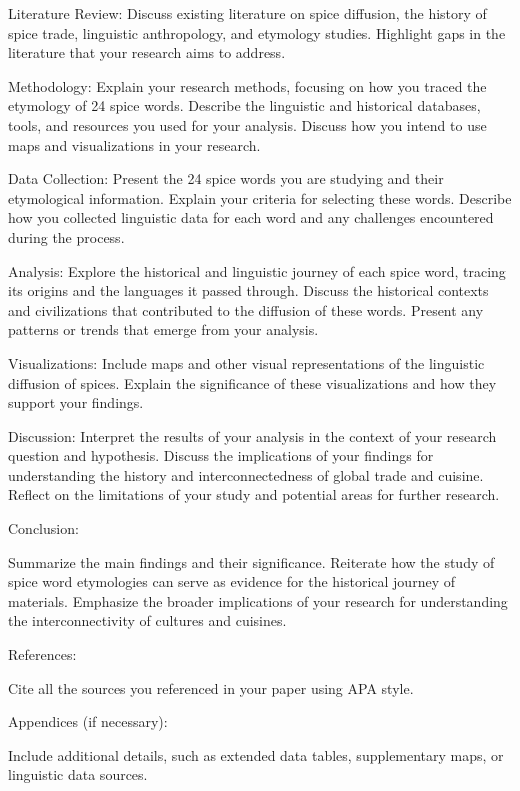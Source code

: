 \documentclass{dsh} %
\begin{document}
    Literature Review:
        Discuss existing literature on spice diffusion, the history of spice trade, linguistic anthropology, and etymology studies.
        Highlight gaps in the literature that your research aims to address.

    Methodology:
        Explain your research methods, focusing on how you traced the etymology of 24 spice words.
        Describe the linguistic and historical databases, tools, and resources you used for your analysis.
        Discuss how you intend to use maps and visualizations in your research.

    Data Collection:
        Present the 24 spice words you are studying and their etymological information.
        Explain your criteria for selecting these words.
        Describe how you collected linguistic data for each word and any challenges encountered during the process.

    Analysis:
        Explore the historical and linguistic journey of each spice word, tracing its origins and the languages it passed through.
        Discuss the historical contexts and civilizations that contributed to the diffusion of these words.
        Present any patterns or trends that emerge from your analysis.

    Visualizations:
        Include maps and other visual representations of the linguistic diffusion of spices. Explain the significance of these visualizations and how they support your findings.

    Discussion:
        Interpret the results of your analysis in the context of your research question and hypothesis.
        Discuss the implications of your findings for understanding the history and interconnectedness of global trade and cuisine.
        Reflect on the limitations of your study and potential areas for further research.

    Conclusion:

    Summarize the main findings and their significance.
    Reiterate how the study of spice word etymologies can serve as evidence for the historical journey of materials.
    Emphasize the broader implications of your research for understanding the interconnectivity of cultures and cuisines.

    References:

    Cite all the sources you referenced in your paper using APA style.

    Appendices (if necessary):

    Include additional details, such as extended data tables, supplementary maps, or linguistic data sources.
\end{document}
